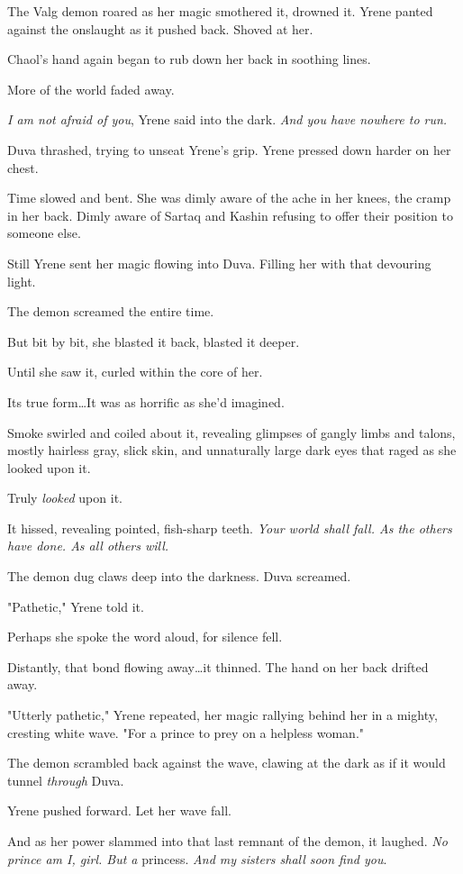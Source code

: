 The Valg demon roared as her magic smothered it, drowned it.
Yrene panted against the onslaught as it pushed back.
Shoved at her.

Chaol's hand again began to rub down her back in soothing lines.

More of the world faded away.

\emph{I am not afraid of you}, Yrene said into the dark.
\emph{And you have nowhere to run.}

Duva thrashed, trying to unseat Yrene's grip.
Yrene pressed down harder on her chest.

Time slowed and bent.
She was dimly aware of the ache in her knees, the cramp in her back.
Dimly aware of Sartaq and Kashin refusing to offer their position to someone else.

Still Yrene sent her magic flowing into Duva.
Filling her with that devouring light.

The demon screamed the entire time.

But bit by bit, she blasted it back, blasted it deeper.

Until she saw it, curled within the core of her.

Its true form\ldots It was as horrific as she'd imagined.

Smoke swirled and coiled about it, revealing glimpses of gangly limbs and talons, mostly hairless gray, slick skin, and unnaturally large dark eyes that raged as she looked upon it.

Truly \emph{looked} upon it.

It hissed, revealing pointed, fish-sharp teeth.
\emph{Your world shall fall.
As the others have done.
As all others will.}

The demon dug claws deep into the darkness.
Duva screamed.

"Pathetic," Yrene told it.

Perhaps she spoke the word aloud, for silence fell.

Distantly, that bond flowing away\ldots it thinned.
The hand on her back drifted away.

"Utterly pathetic," Yrene repeated, her magic rallying behind her in a mighty, cresting white wave.
"For a prince to prey on a helpless woman."

The demon scrambled back against the wave, clawing at the dark as if it would tunnel \emph{through} Duva.

Yrene pushed forward.
Let her wave fall.

And as her power slammed into that last remnant of the demon, it laughed.
\emph{No prince am I, girl.
But a} princess.
\emph{And my sisters shall soon find you}.

